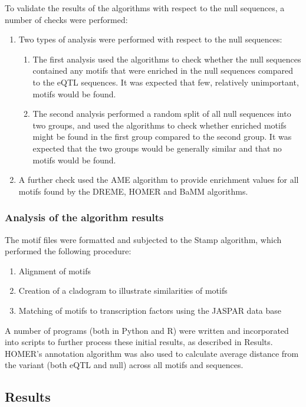 \documentclass[12pt]{article}
\begin{document}
To validate the results of the algorithms with respect to the null sequences, a number of checks were performed:
\begin{enumerate}
\item Two types of analysis were performed with respect to the null sequences:
\begin{enumerate}
\item The first analysis used the algorithms to check whether the null sequences contained any motifs that were enriched in the null sequences compared to the eQTL sequences. It was expected that few, relatively unimportant, motifs would be found.
\item The second analysis performed a random split of all null sequences into two groups, and used the algorithms to check whether enriched motifs might be found in the first group compared to the second group. It was expected that the two groups would be generally similar and that no motifs would be found. 
\end{enumerate}
\item A further check used the AME algorithm \citep{Buske2010} to provide enrichment values for all motifs found by the DREME, HOMER and BaMM algorithms. 
\end{enumerate}

\subsubsection{Analysis of the algorithm results}

The motif files were formatted and subjected to the Stamp algorithm, which performed the following procedure:
\begin{enumerate}
\item Alignment of motifs
\item Creation of a cladogram to illustrate similarities of motifs
\item Matching of motifs to transcription factors using the JASPAR data base \citep{Mathelier2016}
\end{enumerate}

A number of programs (both in Python and R) were written and incorporated into scripts to further process these initial results, as described in Results. HOMER's annotation algorithm was also used to calculate average distance from the variant (both eQTL and null) across all motifs and sequences.

\subsection{Results}
\end{document}
